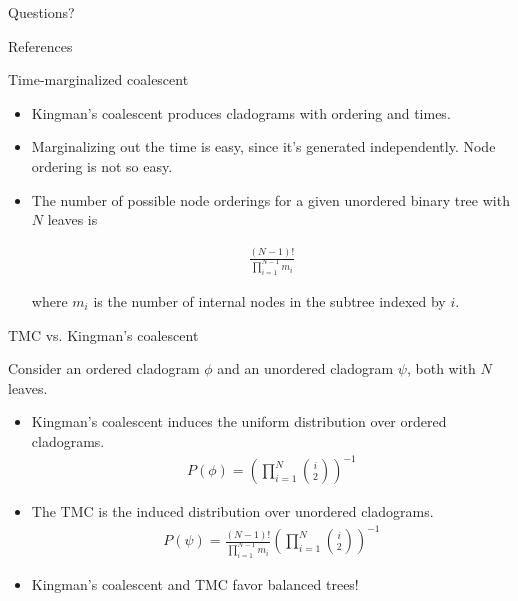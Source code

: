 \documentclass[10pt, compress]{beamer}
\begin{document}
\begin{frame}[standout]
Questions?
\end{frame}

\begin{frame}[allowframebreaks]{References}
  
  
\end{frame}

\appendix

\begin{frame}{Time-marginalized coalescent}
  \begin{itemize}
    \item<1->Kingman's coalescent produces
  cladograms with ordering and times.


  \item<2->Marginalizing out the time is easy, since it's
    generated independently. Node ordering
    is not so easy.

\item<3-> The number of possible node orderings for a given unordered
  binary tree with $N$ leaves is

  \begin{align}
    \frac{(N - 1)!}{\prod_{i = 1}^{N - 1} m_i}
  \end{align}

  where $m_i$ is the number of internal nodes in the subtree indexed by $i$.
  \end{itemize}
\end{frame}

\begin{frame}{TMC vs. Kingman's coalescent}

  Consider an ordered cladogram $\phi$
  and an unordered cladogram $\psi$, both with $N$ leaves.

  \begin{itemize}
    \item<1-> Kingman's coalescent induces the uniform
    distribution over ordered cladograms.
    \begin{align*}
      P(\phi) = \left(\prod_{i = 1}^{N}\binom{i}{2}\right)^{-1}
    \end{align*}
    \item<2-> The TMC is the induced
    distribution over unordered cladograms.
    \begin{align*}
      P(\psi) = \frac{(N - 1)!}{\prod_{i = 1}^{N - 1} m_i} \left(\prod_{i = 1}^{N}\binom{i}{2}\right)^{-1}
    \end{align*}
    \item<3-> Kingman's coalescent
      and TMC favor balanced trees!
  \end{itemize}
\end{frame}
\end{document}
